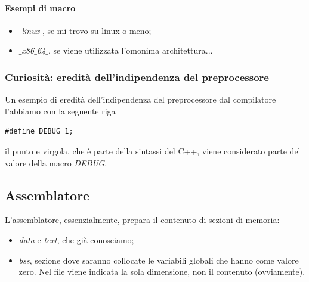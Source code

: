 \documentclass[11pt]{report}
\theoremstyle{definition}
\begin{document}
\paragraph{Esempi di macro}
\begin{itemize}
\item \emph{$\_$linux$\_$}, se mi trovo su linux o meno;
\item \emph{$\_$x86$\_$64$\_$}, se viene utilizzata l'omonima architettura...
\end{itemize}
\subsubsection{Curiosità: eredità dell'indipendenza del preprocessore}
Un esempio di eredità dell'indipendenza del preprocessore dal compilatore l'abbiamo con la seguente riga
\begin{verbatim}
#define DEBUG 1;
\end{verbatim}
il punto e virgola, che è parte della sintassi del C++, viene considerato parte del valore della macro \emph{DEBUG}.
\clearpage
\subsection{Assemblatore}
L'assemblatore, essenzialmente, prepara il contenuto di sezioni di memoria:
\begin{itemize}
	\item \emph{data} e \emph{text}, che già conosciamo;
	\item \emph{bss}, sezione dove saranno collocate le variabili globali che hanno come valore zero. Nel file viene indicata la sola dimensione, non il contenuto (ovviamente).
\end{itemize} 
\end{document}
